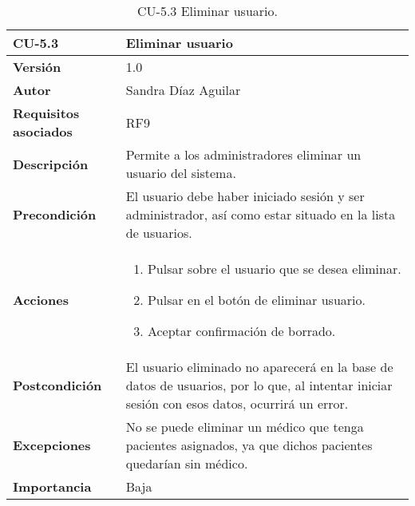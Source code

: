\begin{table}[p]
	\centering
	\begin{tabularx}{\linewidth}{ p{} p{} }
		\toprule
		\textbf{CU-5.3}    & \textbf{Eliminar usuario}\\
		\toprule
		\textbf{Versión}              & 1.0    \\
		\textbf{Autor}                & Sandra Díaz Aguilar \\
		\textbf{Requisitos asociados} & RF9 \\
		\textbf{Descripción}          & Permite a los administradores eliminar un usuario del sistema. \\
		\textbf{Precondición}         & El usuario debe haber iniciado sesión y ser administrador, así como estar situado en la lista de usuarios. \\
		\textbf{Acciones}             &
		\begin{enumerate}
			\def\labelenumi{\arabic{enumi}.}
			\tightlist
			\item Pulsar sobre el usuario que se desea eliminar. 
			\item Pulsar en el botón de eliminar usuario. 
            \item Aceptar confirmación de borrado. 
		\end{enumerate}\\
		\textbf{Postcondición}        & El usuario eliminado no aparecerá en la base de datos de usuarios, por lo que, al intentar iniciar sesión con esos datos, ocurrirá un error.  \\
		\textbf{Excepciones}          & No se puede eliminar un médico que tenga pacientes asignados, ya que dichos pacientes quedarían sin médico.  \\
		\textbf{Importancia}          & Baja \\
		\bottomrule
	\end{tabularx}
	\caption{CU-5.3 Eliminar usuario.}
\end{table}